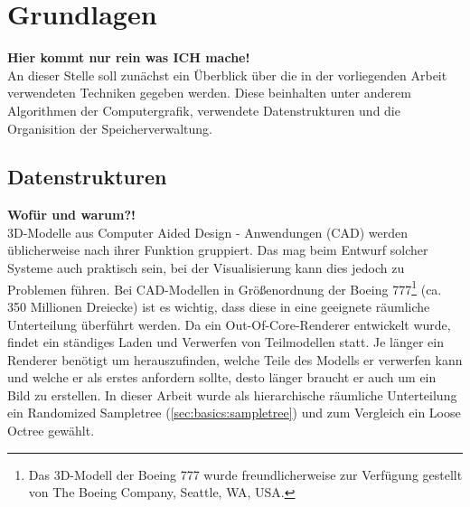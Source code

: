 \chapter{Grundlagen}
\label{chap:basics}
%
\textbf{Hier kommt nur rein was ICH mache!}\\
An dieser Stelle soll zunächst ein Überblick über die in der vorliegenden Arbeit verwendeten Techniken gegeben werden. Diese beinhalten unter anderem Algorithmen der Computergrafik, verwendete Datenstrukturen und die Organisition der Speicherverwaltung.

\section{Datenstrukturen}
\label{sec:basics:datenstrukturen}
\textbf{Wofür und warum?!}\\
3D-Modelle aus Computer Aided Design - Anwendungen (CAD) werden üblicherweise nach ihrer Funktion gruppiert. Das mag beim Entwurf solcher Systeme auch praktisch sein, bei der Visualisierung kann dies jedoch zu Problemen führen. Bei CAD-Modellen in Größenordnung der Boeing 777\footnote{%
Das 3D-Modell der Boeing 777 wurde freundlicherweise zur Verfügung gestellt von The Boeing Company, Seattle, WA, USA.} (ca. 350 Millionen Dreiecke) ist es wichtig, dass diese in eine geeignete räumliche Unterteilung überführt werden. Da ein Out-Of-Core-Renderer entwickelt wurde, findet ein ständiges Laden und Verwerfen von Teilmodellen statt. Je länger ein Renderer benötigt um herauszufinden, welche Teile des Modells er verwerfen kann und welche er als erstes anfordern sollte, desto länger braucht er auch um ein Bild zu erstellen. In dieser Arbeit wurde als hierarchische räumliche Unterteilung ein Randomized Sampletree (\ref{sec:basics:sampletree}) und zum Vergleich ein Loose Octree gewählt.

